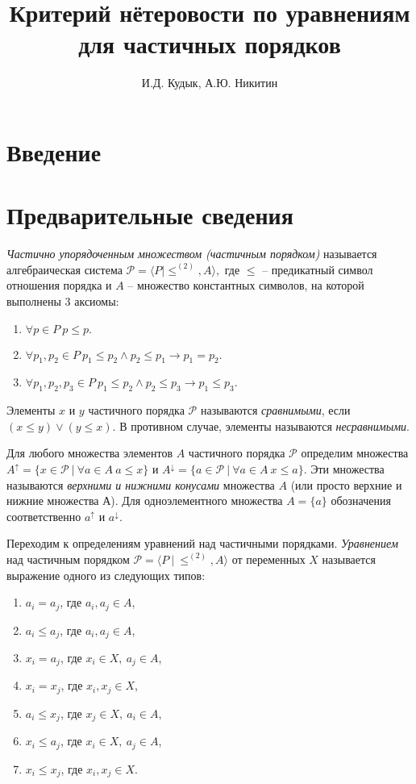 \documentclass[12pt]{article}
\title{Критерий нётеровости по уравнениям для частичных порядков}
\author{И.Д. Кудык, А.Ю. Никитин}
\theoremstyle{break}
\def\P{\mathcal{P}}
\begin{document}
    \maketitle %
    \thispagestyle{empty} %
    \tableofcontents %
    \newpage
    
    \section{Введение} %

	\section{Предварительные сведения}
			
		\textit{Частично упорядоченным множеством (частичным порядком)} называется алгебраическая система $\P = \langle P | \leqslant^{(2)}, A\rangle,$ где $\leqslant$ -- предикатный символ отношения порядка и $A$ -- множество константных символов, на которой выполнены 3 аксиомы:
		\begin{enumerate}
			\item $\forall p\in P\ p\leqslant p.$
			\item $\forall p_1, p_2\in P\ p_1 \leqslant p_2 \wedge p_2 \leqslant p_1 \rightarrow p_1=p_2.$
			\item $\forall p_1, p_2, p_3\in P\ p_1 \leqslant p_2 \wedge p_2 \leqslant p_3 \rightarrow p_1 \leqslant p_3.$
		\end{enumerate}
		
		Элементы $x$ и $y$ частичного порядка $\P$ называются \textit{сравнимыми}, если $(x\leqslant y)\vee (y\leqslant x).$ В противном случае, элементы называются \textit{несравнимыми}.
	
		Для любого множества элементов $A$ частичного порядка $\P$ определим множества $A^{\uparrow} = \{ x\in\P\ |\ \forall a\in A\ a\leqslant x\}$ и $A^{\downarrow} = \{ a\in\P\ |\ \forall a\in A\ x\leqslant a\}$. Эти множества называются \textit{верхними и нижними конусами} множества $A$ (или просто верхние и нижние множества А). Для одноэлементного множества $A=\{a\}$ обозначения соответственно $a^{\uparrow}$ и $a^{\downarrow}.$

		Переходим к определениям уравнений над частичными порядками. \textit{Уравнением} над частичным порядком $\P = \langle P~|~\leqslant^{(2)}, A\rangle$ от переменных $X$ называется выражение одного из следующих типов:
		\begin{enumerate}
			\item $a_i=a_j$, где $a_i, a_j\in A$,
			\item $a_i\leqslant a_j$, где $a_i, a_j\in A$,
			\item $x_i=a_j$, где $x_i\in X,~a_j\in A$,
			\item $x_i=x_j$, где $x_i, x_j\in X$,
			\item $a_i\leqslant x_j$, где $x_j\in X,~a_i\in A$,
			\item $x_i\leqslant a_j$, где $x_i\in X,~a_j\in A$,
			\item $x_i\leqslant x_j$, где $x_i, x_j\in X$.
		\end{enumerate}
\end{document}
